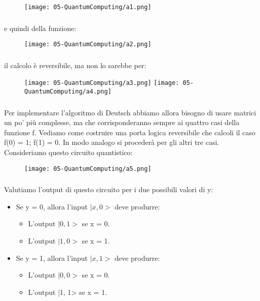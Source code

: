 \begin{figure}[h]
    \centering
    \texttt{[image: 05-QuantumComputing/a1.png]}
\end{figure}
\subsubsection{}
e quindi della funzione: 

\begin{figure}[h]
    \centering
    \texttt{[image: 05-QuantumComputing/a2.png]}
\end{figure}
\subsubsection{}
il calcolo è reversibile, ma non lo sarebbe per: 

\begin{figure}[!h]
    \centering
    \texttt{[image: 05-QuantumComputing/a3.png]}
    \texttt{[image: 05-QuantumComputing/a4.png]}
\end{figure}

\subsubsection{}
Per implementare l’algoritmo di Deutsch abbiamo allora bisogno di
usare matrici un po’ più complesse, ma che corrisponderanno sempre
ai quattro casi della funzione f. Vediamo come costruire una porta
logica reversibile che calcoli il caso f(0) = 1; f(1) = 0. In modo
analogo si procederà per gli altri tre casi.
Consideriamo questo circuito quantistico:

\begin{figure}[h]
    \centering
    \texttt{[image: 05-QuantumComputing/a5.png]}
\end{figure}

\subsubsection{}

Valutiamo l’output di questo circuito per i due possibili valori di y: 

\begin{itemize}
  \item Se y = 0, allora l’input $|x, 0>$ deve produrre:
    \begin{itemize}
      \item L’output $|0, 1>$ se x = 0. 
      \item L’output $|1, 0>$ se x = 1.
    \end{itemize}
  \item Se y = 1, allora l’input $|x, 1>$ deve produrre:
    \begin{itemize}
      \item L’output $|0, 0>$ se x = 0.
      \item L’output |1, 1> se x = 1.
    \end{itemize}
\end{itemize}
